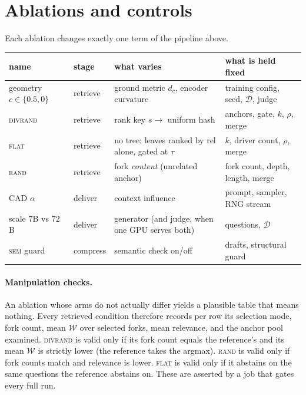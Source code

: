 \documentclass[11pt]{article}
\newcommand{\Wass}{\mathcal{W}}
\newcommand{\rel}{\mathrm{rel}}
\begin{document}
\section{Ablations and controls}

\label{sec:ablations}
Each ablation changes exactly one term of the pipeline above.

\begin{center}\small
\begin{tabular}{@{}llp{4.6cm}p{4.2cm}@{}}
\toprule
name & stage & what varies & what is held fixed \\
\midrule
geometry $c \in \{0.5, 0\}$ & retrieve & ground metric $d_c$, encoder curvature & training config, seed, $\mathcal{D}$, judge \\
\textsc{divrand} & retrieve & rank key $s \to$ uniform hash & anchors, gate, $k$, $\rho$, merge \\
\textsc{flat} & retrieve & no tree: leaves ranked by $\rel$ alone, gated at $\tau$ & $k$, driver count, $\rho$, merge \\
\textsc{rand} & retrieve & fork \emph{content} (unrelated anchor) & fork count, depth, length, merge \\
CAD $\alpha$ & deliver & context influence & prompt, sampler, RNG stream \\
scale $7$B vs $72$B & deliver & generator (and judge, when one GPU serves both) & questions, $\mathcal{D}$ \\
\textsc{sem} guard & compress & semantic check on/off & drafts, structural guard \\
\bottomrule
\end{tabular}
\end{center}

\paragraph{Manipulation checks.} An ablation whose arms do not actually differ
yields a plausible table that means nothing. Every retrieved condition therefore
records per row its selection mode, fork count, mean $\Wass$ over selected
forks, mean relevance, and the anchor pool examined. \textsc{divrand} is valid
only if its fork count equals the reference's and its mean $\Wass$ is strictly
lower (the reference takes the argmax). \textsc{rand} is valid only if fork
counts match and relevance is lower. \textsc{flat} is valid only if it abstains
on the same questions the reference abstains on. These are asserted by a job
that gates every full run.
\end{document}
